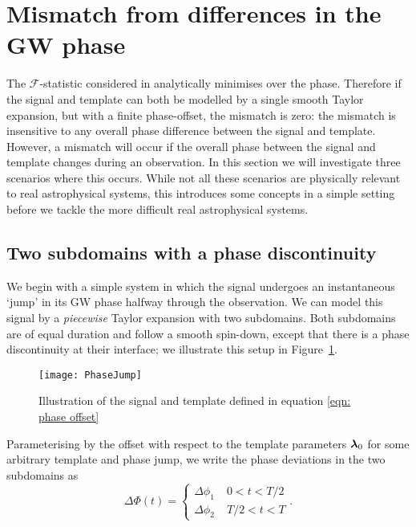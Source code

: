 \documentclass[../full_thesis/full_thesis.tex]{subfiles}
\begin{document}
\section{Mismatch from differences in the GW phase}
\label{sec: mismatch from differences in the gw phase}

The $\mathcal{F}$-statistic considered in \citet{Brady1998} analytically
minimises over the phase. Therefore if the signal and template can both be
modelled by a single smooth Taylor expansion, but with a finite phase-offset,
the mismatch is zero: the mismatch is insensitive to any overall phase
difference between the signal and template. However, a mismatch will occur if
the overall phase between the signal and template changes during an
observation. In this section we will investigate three scenarios where this
occurs. While not all these scenarios are physically relevant to real astrophysical
systems, this introduces some concepts in a simple setting before we tackle
the more difficult real astrophysical systems.

\subsection{Two subdomains with a phase discontinuity}
\label{sec: Two segments with a phase offset}

We begin with a simple system in which the signal undergoes an instantaneous
`jump' in its GW phase halfway through the observation. We can model this
signal by a \emph{piecewise} Taylor expansion with two subdomains.  Both
subdomains are of equal duration and follow a smooth spin-down, except that
there is a phase discontinuity at their interface; we illustrate this setup in
Figure~\ref{fig: PhaseJump}.
\begin{figure}[htb]
    \centering
    \texttt{[image: PhaseJump]}
    \caption{Illustration of the signal and template defined in equation
        \eqref{eqn: phase offset}}
    \label{fig: PhaseJump}
\end{figure}
Parameterising by the offset with respect to the template parameters ${\bm{\lambda}}_{0}$ for some
arbitrary template and phase jump, we write the phase deviations in the two
subdomains as
\begin{equation}
 \Delta\Phi(t) = \left\{
\begin{array}{cr}
\Delta \phi_{1}& \; 0 < t < T/2 \\
\Delta \phi_{2} & \;  T/2 < t < T
\end{array}.
\right.
\label{eqn: phase offset}
\end{equation}
\end{document}
